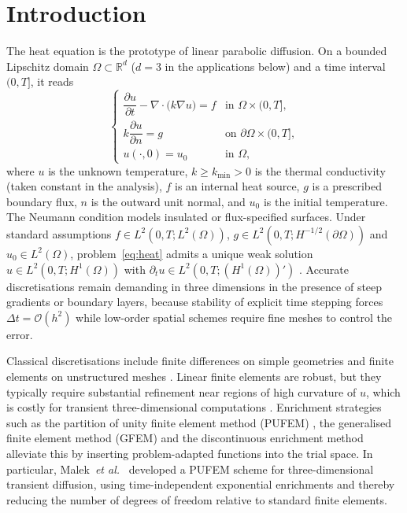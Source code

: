 \documentclass[final,3p,times]{elsarticle}
\theoremstyle{plain}
\theoremstyle{definition}
\theoremstyle{remark}
\begin{document}
\section{Introduction}
\label{sec:intro}

The heat equation is the prototype of linear parabolic diffusion. On a bounded
Lipschitz domain $\Omega\subset\mathbb{R}^d$ ($d=3$ in the applications below)
and a time interval $(0,T]$, it reads
\begin{equation}
\label{eq:heat}
\begin{cases}
\dfrac{\partial u}{\partial t}-\nabla\cdot\bigl(k\nabla u\bigr)=f
& \text{in }\Omega\times(0,T],\\[4pt]
k\dfrac{\partial u}{\partial n}=g
& \text{on }\partial\Omega\times(0,T],\\[4pt]
u(\cdot,0)=u_0
& \text{in }\Omega,
\end{cases}
\end{equation}
where $u$ is the unknown temperature, $k\ge k_{\min}>0$ is the thermal
conductivity (taken constant in the analysis), $f$ is an internal heat source,
$g$ is a prescribed boundary flux, $n$ is the outward unit normal, and $u_0$ is
the initial temperature. The Neumann condition models insulated or
flux-specified surfaces. Under standard assumptions
$f\in L^2(0,T;L^2(\Omega))$, $g\in L^2(0,T;H^{-1/2}(\partial\Omega))$ and
$u_0\in L^2(\Omega)$, problem~\eqref{eq:heat} admits a unique weak solution
$u\in L^2(0,T;H^1(\Omega))$ with $\partial_t u\in L^2(0,T;(H^1(\Omega))')$
\cite{Evans2010,Brezis2011}. Accurate discretisations remain demanding in three
dimensions in the presence of steep gradients or boundary layers, because
stability of explicit time stepping forces $\Delta t=\mathcal{O}(h^2)$ while
low-order spatial schemes require fine meshes to control the error.

Classical discretisations include finite differences on simple geometries
\cite{Gibou2007} and finite elements on unstructured meshes
\cite{Babuska1973,Quarteroni2008,Thomee1997}. Linear finite elements are
robust, but they typically require substantial refinement near regions of high
curvature of $u$, which is costly for transient three-dimensional computations
\cite{Mohamed2013,OHara2009}. Enrichment strategies such as the partition of
unity finite element method (PUFEM) \cite{Melenk1996}, the generalised finite
element method (GFEM) \cite{Strouboulis2000} and the discontinuous enrichment
method \cite{Farhat2001,Mohamed2014} alleviate this by inserting
problem-adapted functions into the trial space. In particular,
Malek~\emph{et al.}~\cite{Malek2019} developed a PUFEM scheme for
three-dimensional transient diffusion, using time-independent exponential
enrichments and thereby reducing the number of degrees of freedom relative to
standard finite elements.
\end{document}
